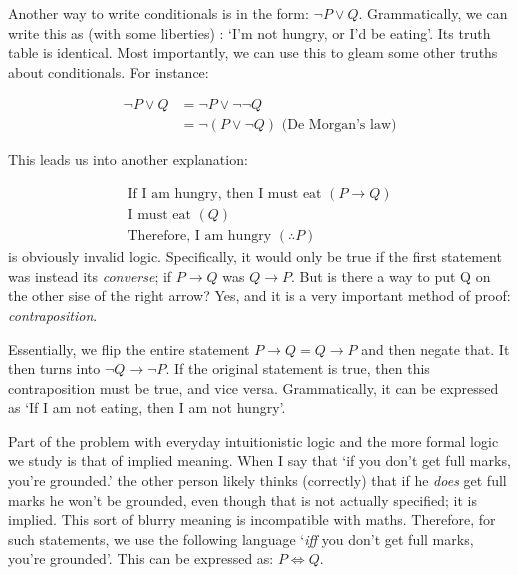 \documentclass[a4paper, 11pt]{article}
\begin{document}
Another way to write conditionals is in the form: $\neg P \vee Q$. Grammatically, we can write this as (with some liberties) : `I'm not hungry, or I'd be eating'. Its truth table is identical. Most importantly, we can use this to gleam some other truths about conditionals. For instance:

\begin{align*}
  \neg P \vee Q & = \neg P \vee \neg \neg Q                        \\
                & = \neg (P \vee \neg Q) \text{ (De Morgan's law)}
\end{align*}

This leads us into another explanation:

\begin{align*}
  \text{If I am hungry, then I must eat } (P \rightarrow Q) \\
  \text{I must eat } (Q)                                    \\
  \text{Therefore, I am hungry } (\therefore P)
\end{align*}
is obviously invalid logic. Specifically, it would only be true if the first statement was instead its \textit{converse}; if $P \rightarrow Q$ was $Q \rightarrow P$. But is there a way to put Q on the other sise of the right arrow? Yes, and it is a very important method of proof: \textit{contraposition}.

Essentially, we flip the entire statement $P \rightarrow Q = Q \rightarrow P$ and then negate that. It then turns into $\neg Q \rightarrow \neg P$. If the original statement is true, then this contraposition must be true, and vice versa. Grammatically, it can be expressed as `If I am not eating, then I am not hungry'.

Part of the problem with everyday intuitionistic logic and the more formal logic we study is that of implied meaning. When I say that `if you don't get full marks, you're grounded.' the other person likely thinks (correctly) that if he \textit{does} get full marks he won't be grounded, even though that is not actually specified; it is implied. This sort of blurry meaning is incompatible with maths. Therefore, for such statements, we use the following language `\textit{iff} you don't get full marks, you're grounded'. This can be expressed as: $P \iff Q$.

\clearpage
\end{document}
